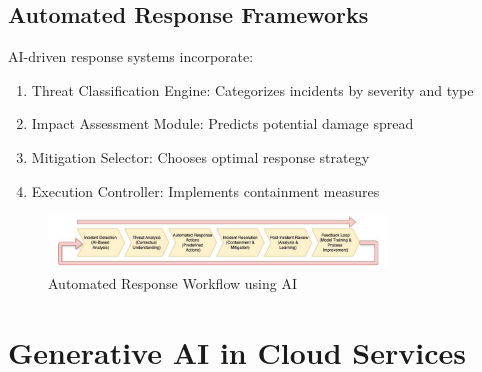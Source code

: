 \documentclass[a4paper,12pt]{article}
\begin{document}
\subsection{Automated Response Frameworks}
AI-driven response systems incorporate:
\begin{enumerate}
    \item Threat Classification Engine: Categorizes incidents by severity and type
    \item Impact Assessment Module: Predicts potential damage spread
    \item Mitigation Selector: Chooses optimal response strategy
    \item Execution Controller: Implements containment measures
\end{enumerate}

\begin{figure}[H]
    \centering
    \includegraphics[width=0.8\textwidth]{image2.png}
    \caption{Automated Response Workflow using AI}
    \label{fig:auto-workflow-ai}
\end{figure}

\section{Generative AI in Cloud Services}
\end{document}
